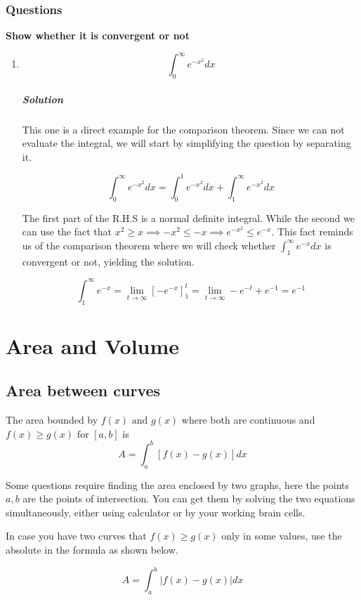 \documentclass{article}
\begin{document}
\subsubsection{Questions}

\textbf{ Show whether it is convergent or not}
	\begin{enumerate}[1.]

		\item \[\int^{\infty}_{0} e^{-x^2} dx\]
		
			\subparagraph{Solution}
			This one is a direct example for the comparison theorem. Since we can not evaluate the integral, we will start by simplifying the question by separating it.

			\[
				\int^{\infty}_{0} e^{-x^2} dx = \int^{1}_{0}   e^{-x^2} dx +
				\int^{\infty}_{1}  e^{-x^2}  dx  
			\]

			The first part of the R.H.S is a normal definite integral. While the second we can use the fact that $ x^2 	\geq x \implies -x^2 	\leq -x  \implies e^{-x^2} 	\leq e^{-x}$. This fact reminds us of the comparison theorem where we will check whether $ \int^{\infty}_{1} e^{-x} dx   $  is convergent or not, yielding the solution.

			\[
				\int^{\infty}_{1} e^{-x} = \lim_{t 	\to \infty} [-e^{-x}]^t_1 =
				\lim_{t \to \infty} -e^{-t}+e^{-1} = e^{-1}
			\]
			
	\end{enumerate}
	\newpage
	\section{Area and Volume}
	\subsection{Area between curves }
	The area bounded by $ f(x) \text{ and } g(x) $ where both are continuous and $ f(x)	\geq g(x) 
	\text{ for  } [a,b]$ is
	\[
		A = \int^{b}_{a} [f(x)-g(x)] dx  
	\]
	
	Some questions require finding the area enclosed by two graphs, here the points $ a, b $ are the points of intersection.
	You can get them by solving the two equations simultaneously, either using calculator or by your working brain cells.
	
	In case you have two curves that $ f(x) 	\geq g(x)  $ only in some values, use the absolute in the formula as shown below.

	\[
		A = \int^{b}_{a} |f(x)-g(x)| dx  
	\]
\end{document}
